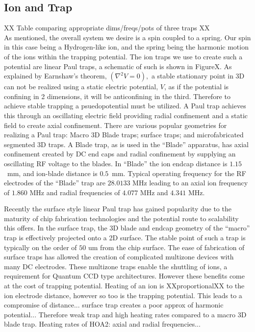 \documentclass[12pt]{iopart}
\begin{document}
\subsection{Ion and Trap}

XX Table comparing appropriate dims/freqs/pots of three traps XX\\

As mentioned, the overall system we desire is a spin coupled to a
spring. Our spin in this case being a Hydrogen-like ion, and the
spring being the harmonic motion of the ions within the trapping
potential. The ion traps we use to create such a potential are linear
Paul traps, a schematic of such is shown in FigureX. As explained by
Earnshaw's theorem, $(\nabla^2 V = 0),$
a stable stationary point in 3D can not be realized using a static
electric potential, $V$, as if the potential is confining in 2
dimensions, it will be anticonfining in the third. Therefore to
achieve stable trapping a psuedopotential must be utilized.
A Paul trap achieves this through an oscillating electric field
providing radial confinement and a static field to create axial
confinement. There are various popular geometries for realizing a Paul
trap: Macro 3D Blade traps; surface traps; and microfabricated
segmented 3D traps.  A Blade trap, as is used in the ``Blade''
apparatus, has axial confinement created by DC end caps and radial
confinement by supplying an oscillating RF voltage to the blades. In
``Blade'' the ion endcap distance is $1.15$~mm, and ion-blade distance
is $0.5$~mm. Typical operating frequency for the RF electrodes of the
``Blade'' trap are $28.0133$ MHz leading to an axial ion frequency of
$1.860$ MHz and radial frequencies of $4.077$ MHz and $4.341$ MHz.

Recently the surface style linear Paul
trap has gained popularity due to the maturity of chip fabrication
technologies and the potential route to scalability this offers. In
the surface trap, the 3D blade and endcap geometry of the ``macro''
trap is effectively projected onto a 2D surface. The stable point of
such a trap is typically on the order of $50$ um from the chip
surface. The ease of fabrication of surface traps has allowed the
creation of complicated multizone devices with many DC electrodes.
These multizone traps enable the shuttling of ions, a requirement for
Quantum CCD type architectures. However these benefits come at the
cost of trapping potential. Heating of an ion is XXproportionalXX to
the ion electrode distance, however so too is the trapping
potential. This leads to a compromise of distance... surface trap
creates a poor approx of harmonic potential... Therefore weak trap and
high heating rates compared to a macro 3D blade trap. Heating rates of
HOA2: axial and radial frequencies...
\end{document}
